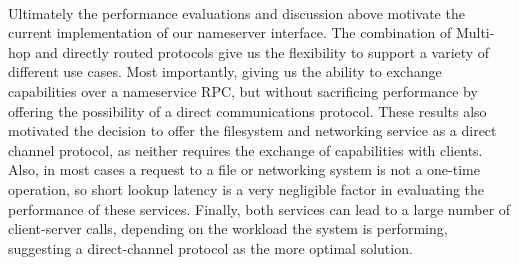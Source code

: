 \paragraph{}
Ultimately the performance evaluations and discussion above motivate the current implementation of our nameserver interface. The combination of Multi-hop and directly routed protocols give us the flexibility to support a variety of different use cases. Most importantly, giving us the ability to exchange capabilities over a nameservice RPC, but without sacrificing performance by offering the possibility of a direct communications protocol. These results also motivated the decision to offer the filesystem and networking service as a direct channel protocol, as neither requires the exchange of capabilities with clients. Also, in most cases a request to a file or networking system is not a one-time operation, so short lookup latency is a very negligible factor in evaluating the performance of these services. Finally, both services can lead to a large number of client-server calls, depending on the workload the system is performing, suggesting a direct-channel protocol as the more optimal solution.







